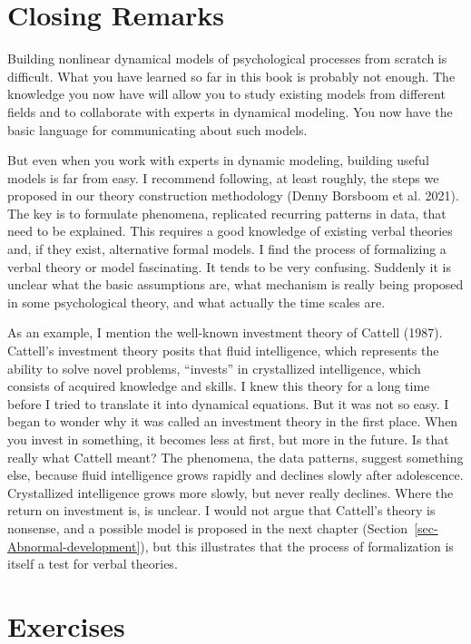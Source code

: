 \documentclass[
  a4paper,
  DIV=11,
  numbers=noendperiod,
  oneside]{scrreprt}
\begin{document}
\hypertarget{sec-Closing-Remarks}{%
\section{Closing Remarks}\label{sec-Closing-Remarks}}

Building nonlinear dynamical models of psychological processes from
scratch is difficult. What you have learned so far in this book is
probably not enough. The knowledge you now have will allow you to study
existing models from different fields and to collaborate with experts in
dynamical modeling. You now have the basic language for communicating
about such models.

But even when you work with experts in dynamic modeling, building useful
models is far from easy. I recommend following, at least roughly, the
steps we proposed in our theory construction methodology (Denny Borsboom
et al. 2021). The key is to formulate phenomena, replicated recurring
patterns in data, that need to be explained. This requires a good
knowledge of existing verbal theories and, if they exist, alternative
formal models. I find the process of formalizing a verbal theory or
model fascinating. It tends to be very confusing. Suddenly it is unclear
what the basic assumptions are, what mechanism is really being proposed
in some psychological theory, and what actually the time scales are.

As an example, I mention the well-known investment theory of Cattell
(1987). Cattell's investment theory posits that fluid intelligence,
which represents the ability to solve novel problems, ``invests'' in
crystallized intelligence, which consists of acquired knowledge and
skills. I knew this theory for a long time before I tried to translate
it into dynamical equations. But it was not so easy. I began to wonder
why it was called an investment theory in the first place. When you
invest in something, it becomes less at first, but more in the future.
Is that really what Cattell meant? The phenomena, the data patterns,
suggest something else, because fluid intelligence grows rapidly and
declines slowly after adolescence. Crystallized intelligence grows more
slowly, but never really declines. Where the return on investment is, is
unclear. I would not argue that Cattell's theory is nonsense, and a
possible model is proposed in the next chapter
(Section~\ref{sec-Abnormal-development}), but this illustrates that the
process of formalization is itself a test for verbal theories.

\hypertarget{sec-Exercises}{%
\section{Exercises}\label{sec-Exercises}}
\end{document}
